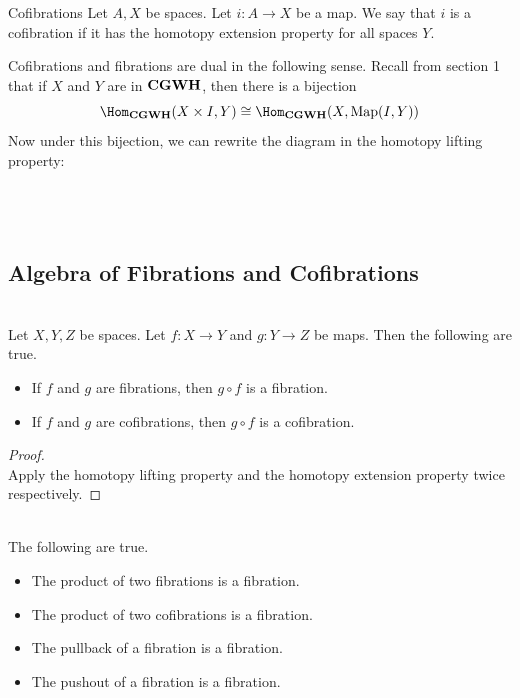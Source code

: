 \documentclass[a4paper]{article}
\begin{document}
\begin{defn}{Cofibrations}{} Let $A,X$ be spaces. Let $i:A\to X$ be a map. We say that $i$ is a cofibration if it has the homotopy extension property for all spaces $Y$. 
\end{defn}

Cofibrations and fibrations are dual in the following sense. Recall from section 1 that if $X$ and $Y$ are in $\bold{CGWH}$, then there is a bijection $$\Hom_{\bold{CGWH}}(X\times I,Y)\cong\Hom_{\bold{CGWH}}(X,\text{Map}(I,Y))$$ Now under this bijection, we can rewrite the diagram in the homotopy lifting property: \\~\\
\\~\\

\subsection{Algebra of Fibrations and Cofibrations}
\begin{lmm}{}{}\\
Let $X,Y,Z$ be spaces. Let $f:X\to Y$ and $g:Y\to Z$ be maps. Then the following are true. 
\begin{itemize}
\item If $f$ and $g$ are fibrations, then $g\circ f$ is a fibration. 
\item If $f$ and $g$ are cofibrations, then $g\circ f$ is a cofibration. 
\end{itemize}
\begin{proof}\\
Apply the homotopy lifting property and the homotopy extension property twice respectively. 
\end{proof}
\end{lmm}

\begin{prp}{}{}\\
The following are true. 
\begin{itemize}
\item The product of two fibrations is a fibration. 
\item The product of two cofibrations is a fibration. 
\item The pullback of a fibration is a fibration. 
\item The pushout of a fibration is a fibration. 
\end{itemize}
\end{prp}
\end{document}
